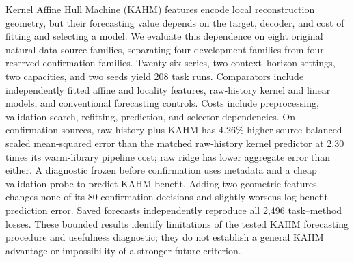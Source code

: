 Kernel Affine Hull Machine (KAHM) features encode local reconstruction
geometry, but their forecasting value depends on the target, decoder, and
cost of fitting and selecting a model. We evaluate this dependence on eight
original natural-data source families, separating four development families
from four reserved confirmation families. Twenty-six series, two
context--horizon settings, two capacities, and two seeds yield 208 task runs.
Comparators include independently fitted affine and locality features,
raw-history kernel and linear models, and conventional forecasting controls.
Costs include preprocessing, validation search, refitting, prediction, and
selector dependencies. On confirmation sources, raw-history-plus-KAHM has
4.26\% higher source-balanced scaled mean-squared error than the matched
raw-history kernel predictor at 2.30 times its warm-library pipeline cost;
raw ridge has lower aggregate error than either. A diagnostic frozen before confirmation
uses metadata and a cheap validation probe to predict KAHM benefit. Adding
two geometric features changes none of its 80 confirmation decisions and
slightly worsens log-benefit prediction error. Saved forecasts independently
reproduce all 2,496 task--method losses. These bounded results identify
limitations of the tested KAHM forecasting procedure and usefulness
diagnostic; they do not establish a general KAHM advantage or impossibility
of a stronger future criterion.
